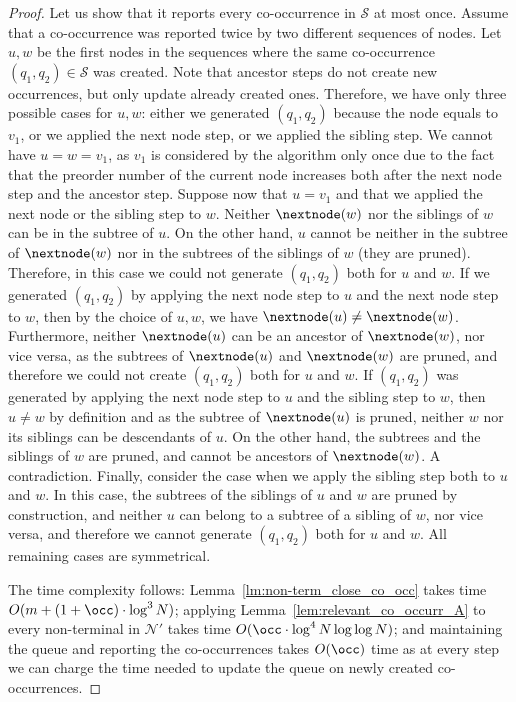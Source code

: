 \begin{proof}
    Let us show that it reports every co-occurrence in $\mathcal{S}$ at most once. Assume that a co-occurrence was reported twice by two different sequences of nodes. 
    Let $u,w$ be the first nodes in the sequences where the same co-occurrence $(q_1,q_2) \in \mathcal{S}$ was created. Note that ancestor steps do not create new occurrences, but only update already created ones. Therefore, we have only three possible cases for $u,w$: either we generated $(q_1,q_2)$ because the node equals to $v_1$, or we applied the next node step, or we applied the sibling step. We cannot have $u = w = v_1$, as $v_1$ is considered by the algorithm only once due to the fact that the preorder number of the current node increases both after the next node step and the ancestor step. Suppose now that $u = v_1$ and that we applied the next node or the sibling step to $w$. Neither $\nextnode(w)$ nor the siblings of $w$ can be in the subtree of $u$. On the other hand, $u$ cannot be neither in the subtree of $\nextnode(w)$ nor in the subtrees of the siblings of $w$ (they are pruned). Therefore, in this case we could not generate $(q_1,q_2)$ both for $u$ and $w$. If we generated $(q_1,q_2)$ by applying the next node step to $u$ and the next node step to $w$, then by the choice of $u,w$, we have $\nextnode(u)\neq \nextnode(w)$. Furthermore, neither $\nextnode(u)$ can be an ancestor of $\nextnode(w)$, nor vice versa, as the subtrees of $\nextnode(u)$ and $\nextnode(w)$ are pruned, and therefore we could not create $(q_1,q_2)$ both for $u$ and $w$. If $(q_1,q_2)$ was generated by applying the next node step to $u$ and the sibling step to $w$, then $u \neq w$ by definition and as the subtree of $\nextnode(u)$ is pruned, neither $w$ nor its siblings can be descendants of $u$. On the other hand, the subtrees and the siblings of $w$ are pruned, and cannot be ancestors of $\nextnode(w)$. A contradiction. Finally, consider the case when we apply the sibling step both to $u$ and $w$. In this case, the subtrees of the siblings of $u$ and $w$ are pruned by construction, and neither $u$ can belong to a subtree of a sibling of $w$, nor vice versa, and therefore we cannot generate $(q_1,q_2)$ both for $u$ and $w$. All remaining cases are symmetrical.  
    
    The time complexity follows: Lemma~\ref{lm:non-term_close_co_occ} takes time $O(m +(1+\occ) \cdot \log^3 N)$; applying Lemma~\ref{lem:relevant_co_occurr_A} to every non-terminal in $\mathcal{N}'$ takes time $O(\occ \cdot \log^{4} N\log\log N)$; and maintaining the queue and reporting the co-occurrences takes $O(\occ)$ time as at every step we can charge the time needed to update the queue on newly created co-occurrences. 
\end{proof}
    
